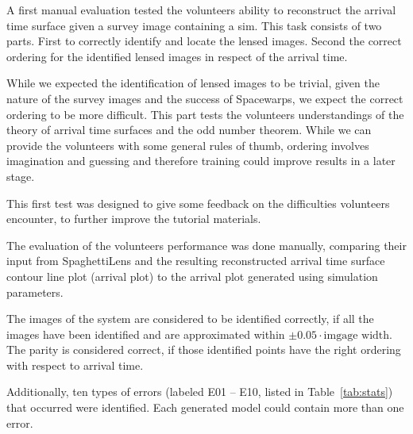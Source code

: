 \documentclass[12pt,preprint]{aastex}
\newcommand{\spl}{SpaghettiLens\xspace}
\newcommand{\sw}{Spacewarps\xspace}
\newcommand{\tabref}[1]{Table~\ref{tab:#1}}
\newcommand{\Figref}[1]{Figure~\ref{fig:#1}}
\begin{document}
A first manual evaluation tested the volunteers ability to reconstruct the arrival time surface given a survey image containing a sim.
This task consists of two parts.
First to correctly identify and locate the lensed images.
Second the correct ordering for the identified lensed images in respect of the arrival time.

While we expected the identification of lensed images to be trivial, given the nature of the survey images and the success of \sw, we expect the correct ordering to be more difficult.
This part tests the volunteers understandings of the theory of arrival time surfaces and the odd number theorem.
While we can provide the volunteers with some general rules of thumb, ordering involves imagination and guessing and therefore training could improve results in a later stage.

This first test was designed to give some feedback on the difficulties volunteers encounter, to further improve the tutorial materials.

The evaluation of the volunteers performance was done manually, comparing their input from \spl and the resulting reconstructed arrival time surface contour line plot (arrival plot) to the arrival plot generated using simulation parameters.

The images of the system are considered to be identified correctly, if all the images have been identified and are approximated within $\pm0.05\cdot\text{imgage width}$.
The parity is considered correct, if those identified points have the right ordering with respect to arrival time.

Additionally, ten types of errors (labeled E01 -- E10, listed in \tabref{stats}) that occurred were identified.
Each generated model could contain more than one error.
\end{document}
